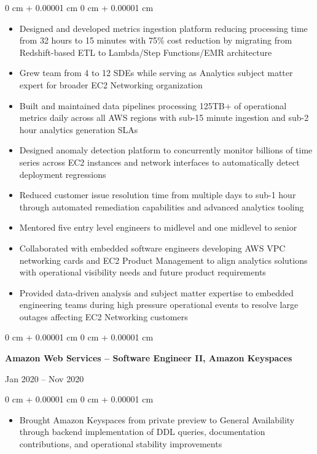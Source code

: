 \documentclass[10pt, letterpaper]{article}
\newenvironment{highlights}{
    \begin{itemize}[
        topsep=0.10 cm,
        parsep=0.10 cm,
        partopsep=0pt,
        itemsep=0pt,
        leftmargin=0 cm + 10pt
    ]
}{
    \end{itemize}
} %
\newenvironment{onecolentry}{
    \begin{adjustwidth}{
        0 cm + 0.00001 cm
    }{
        0 cm + 0.00001 cm
    }
}{
    \end{adjustwidth}
} %
\newenvironment{twocolentry}[2][]{
    \onecolentry
    \def\secondColumn{#2}
    \setcolumnwidth{\fill, 4.5 cm}
    \begin{paracol}{2}
}{
    \switchcolumn \raggedleft \secondColumn
    \end{paracol}
    \endonecolentry
} %
\begin{document}
        \vspace{0.10 cm}
        \begin{onecolentry}
            \begin{highlights}
                \item Designed and developed metrics ingestion platform reducing processing time from 32 hours to 15 minutes with 75\% cost reduction by migrating from Redshift-based ETL to Lambda/Step Functions/EMR architecture
                \item Grew team from 4 to 12 SDEs while serving as Analytics subject matter expert for broader EC2 Networking organization
                \item Built and maintained data pipelines processing 125TB+ of operational metrics daily across all AWS regions with sub-15 minute ingestion and sub-2 hour analytics generation SLAs
                \item Designed anomaly detection platform to concurrently monitor billions of time series across EC2 instances and network interfaces to automatically detect deployment regressions
                \item Reduced customer issue resolution time from multiple days to sub-1 hour through automated remediation capabilities and advanced analytics tooling
                \item Mentored five entry level engineers to midlevel and one midlevel to senior
                \item Collaborated with embedded software engineers developing AWS VPC networking cards and EC2 Product Management to align analytics solutions with operational visibility needs and future product requirements
                \item Provided data-driven analysis and subject matter expertise to embedded engineering teams during high pressure operational events to resolve large outages affecting EC2 Networking customers
            \end{highlights}
        \end{onecolentry}

        \vspace{0.2 cm}

        \begin{twocolentry}{
            Jan 2020 – Nov 2020
        }
            \textbf{Amazon Web Services – Software Engineer II, Amazon Keyspaces}
        \end{twocolentry}

        \vspace{0.10 cm}
        \begin{onecolentry}
            \begin{highlights}
                \item Brought Amazon Keyspaces from private preview to General Availability through backend implementation of DDL queries, documentation contributions, and operational stability improvements
            \end{highlights}
        \end{onecolentry}
\end{document}
